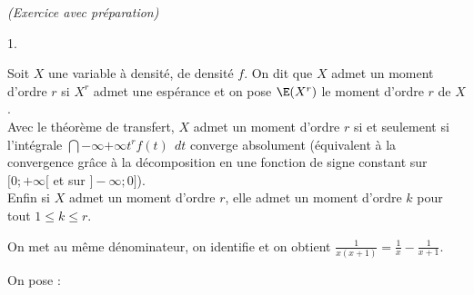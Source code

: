 \documentclass[11pt]{article}%
\begin{document}
 \newpage

 \begin{exercice}{\it (Exercice avec préparation)}~
 \begin{noliste}{1.}
 \setlength{\itemsep}{4mm}
 \item Soit $X$ une variable à densité, de densité $f$. On dit que
 $X$ admet un moment d'ordre $r$ si $X^{r}$ admet une espérance et
 on pose $\E(X^{r})$ le moment d'ordre $r$ de $X$. \\
 Avec le théorème de transfert, $X$ admet un moment d'ordre $r$ si
 et seulement si l'intégrale $\dint{-\infty}{+ \infty} t^{r} f(t)\ \ dt
$ converge absolument (équivalent à la convergence grâce à la
 décomposition en une fonction de signe constant sur $[ 0 ;
 + \infty[$ et sur $] - \infty ; 0]$). \\
 Enfin si $X$ admet un moment d'ordre $r$, elle admet un moment
 d'ordre $k$ pour tout $1 \leq k \leq r$. \\
 \item On met au même dénominateur, on identifie et on obtient
 $\frac{1}{x (x + 1)} = \frac{ 1}{x} - \frac{1}{x + 1}$. 
 \item On pose :
 

\end{noliste}
\end{exercice}
\end{document}
